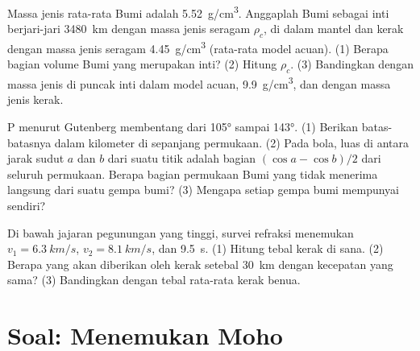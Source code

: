 \begin{exercise}[$\star\star\star$]\label{exo:g11:seismic-structure:13}
Massa jenis rata-rata Bumi adalah \qty{5.52}{g/cm^3}. Anggaplah Bumi sebagai
inti berjari-jari \qty{3480}{km} dengan massa jenis seragam $\rho_c$, di dalam
mantel dan kerak dengan massa jenis seragam \qty{4.45}{g/cm^3} (rata-rata model
acuan). (1) Berapa bagian volume Bumi yang merupakan inti? (2) Hitung
$\rho_c$. (3) Bandingkan dengan massa jenis di puncak inti dalam model
acuan, \qty{9.9}{g/cm^3}, dan dengan massa jenis kerak.
\end{exercise}

\begin{exercise}[$\star\star\star$]\label{exo:g11:seismic-structure:14}
 P menurut Gutenberg membentang dari \ang{105} sampai \ang{143}.
(1) Berikan batas-batasnya dalam kilometer di sepanjang permukaan. (2) Pada
bola, luas di antara jarak sudut $a$ dan $b$ dari suatu titik adalah bagian
$(\cos a - \cos
b)/2$ dari seluruh permukaan. Berapa bagian permukaan Bumi yang tidak menerima
 langsung dari suatu gempa bumi? (3) Mengapa setiap gempa bumi
mempunyai  sendiri?
\end{exercise}

\begin{exercise}[$\star\star\star$]\label{exo:g11:seismic-structure:15}
Di bawah jajaran pegunungan yang tinggi, survei refraksi menemukan $v_1 =
\qty{6.3}{km/s}$, $v_2 = \qty{8.1}{km/s}$, dan 
\qty{9.5}{s}. (1) Hitung tebal kerak di sana. (2) Berapa 
yang akan diberikan oleh kerak setebal \qty{30}{km} dengan kecepatan yang sama?
(3) Bandingkan dengan tebal rata-rata kerak benua.
\end{exercise}

\section{Soal: Menemukan Moho}

